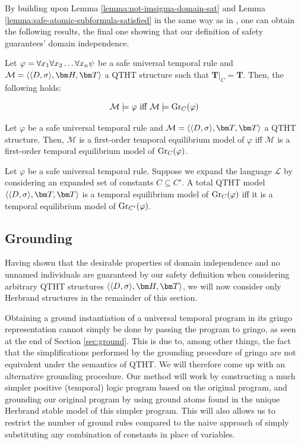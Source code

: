 By building upon Lemma \ref{lemma:not-imsigma-domain-sat} and Lemma
\ref{lemma:safe-atomic-subformula-satisfied} in the same way as in
\cite{agcapevidi17a}, one can obtain the following results, the final
one showing that our definition of safety guarantees' domain independence.

\begin{proposition}\label{prop:sat-iff-sat-groundc}
  Let $\varphi = \forall x_1 \forall x_2 \dots \forall x_n \psi$ be a safe universal temporal rule and \\
  $\mathcal{M} = \qthandt$ a QTHT structure such that
  $\bm{T}\vert_{C}=\bm{T}$. Then, the following holds:

  \begin{equation*}
    \mathcal{M} \models \varphi \text{ iff } \mathcal{M} \models \operatorname{Gr}_{C}(\varphi)
  \end{equation*}
\end{proposition}

\begin{proposition}\label{prop:equil-iff-equil-groundc}
  Let $\varphi$ be a safe universal temporal rule and
  $\mathcal{M} = \qttandt$ a QTHT structure. Then, $\mathcal{M}$ is a
  first-order temporal equilibrium model of $\varphi$ iff
  $\mathcal{M}$ is a first-order temporal equilibrium model of
  $\operatorname{Gr}_{C}(\varphi)$.
\end{proposition}

\begin{theorem}\label{theorem:domain-independence}
  Let $\varphi$ be a safe universal temporal rule. Suppose we expand
  the language $\mathcal{L}$ by considering an expanded set of
  constants $C \subseteq C'$. A total QTHT model $\qttandt$ is a
  temporal equilibrium model of $\operatorname{Gr}_{C}(\varphi)$ iff it is a
  temporal equilibrium model of $\operatorname{Gr}_{C'}(\varphi)$.
\end{theorem}

\subsection{Grounding}
Having shown that the desirable properties of domain independence and
no unnamed individuals are guaranteed by our safety definition when
considering arbitrary QTHT structures $\qthandt$, we will now consider
only Herbrand structures in the remainder of this section.

Obtaining a ground instantiation of a universal temporal program in
its gringo representation cannot simply be done by passing the
program to gringo, as seen at the end of Section
\ref{sec:ground}. This is due to, among other things, the fact that
the simplifications performed by the grounding procedure of gringo are
not equivalent under the semantics of QTHT. We will therefore come up
with an alternative grounding procedure. Our method will work by
constructing a much simpler positive (temporal) logic program based on
the original program, and grounding our original program by using
ground atoms found in the unique Herbrand stable model of this simpler
program. This will also allows us to restrict the number of ground
rules compared to the naive approach of simply substituting any
combination of constants in place of variables.

